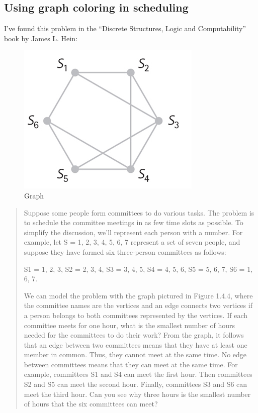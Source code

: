 \subsection{Using graph coloring in scheduling}

I've found this problem in the ``Discrete Structures, Logic and Computability'' book by James L. Hein:

\begin{figure}[H]
\label{fig:pipe_shuffled}
\centering
\includegraphics[scale=0.75]{color/fig144.png}
\caption{Graph}
\end{figure}

\begin{framed}
\begin{quotation}
Suppose some people form committees to do various tasks. The problem is to schedule the committee meetings in as few time slots as possible.
To simplify the discussion, we’ll represent each person with a number. For example, let S = {1, 2, 3, 4, 5, 6, 7} represent a set of seven people, and suppose they have formed six three-person committees as follows:

S1 = {1, 2, 3}, S2 = {2, 3, 4}, S3 = {3, 4, 5}, S4 = {4, 5, 6}, S5 = {5, 6, 7}, S6 = {1, 6, 7}.

We can model the problem with the graph pictured in Figure 1.4.4, where the committee names are the vertices and an edge connects two vertices if a person belongs to both committees represented by the vertices.
If each committee meets for one hour, what is the smallest number of hours needed for the committees to do their work?
From the graph, it follows that an edge between two committees means that they have at least one member in common.
Thus, they cannot meet at the same time. No edge between committees means that they can meet at the same time.
For example, committees S1 and S4 can meet the first hour. Then committees S2 and S5 can meet the second hour.
Finally, committees S3 and S6 can meet the third hour. Can you see why three hours is the smallest number of hours that the six committees can meet?
\end{quotation}
\end{framed}

